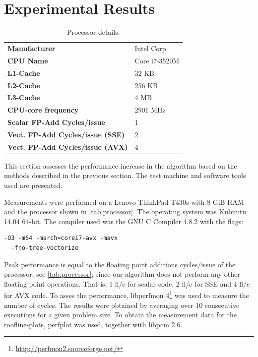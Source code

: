 \section{Experimental Results}

\begin{table}
\begin{center}
\begin{tabular}{>{\bfseries}ll}
Manufacturer         & Intel Corp.\\
CPU Name             & Core i7-3520M\\
L1-Cache             & 32 KB\\
L2-Cache             & 256 KB\\
L3-Cache             & 4 MB\\
CPU-core frequency   & 2901 MHz\\
Scalar FP-Add Cycles/issue  & 1\\
Vect. FP-Add Cycles/issue (SSE) & 2\\
Vect. FP-Add Cycles/issue (AVX) & 4\\
\end{tabular}
\end{center}
\caption{Processor details.}
\label{tab:processor}
\end{table}

This section assesses the performance increase in the algorithm based on
the methods described in the previous section. The test machine and
software tools used are presented.

Measurements were performed on a Lenovo ThinkPad T430s with 8 GiB RAM and
the processor shown in \autoref{tab:processor}. The operating system was
Kubuntu 14.04 64-bit. The compiler used was the GNU C Compiler 4.8.2 with
the flags:
\begin{verbatim}
-O3 -m64 -march=corei7-avx -mavx
  -fno-tree-vectorize
\end{verbatim}

Peak performance is equal to the floating point additions cycles/issue of
the processor, see \autoref{tab:processor}, since our algorithm does not
perform any other floating point operations. That is, 1 fl/c for scalar
code, 2 fl/c for SSE and 4 fl/c for AVX code.
To asses the performance, libperfmon
4\footnote{\url{http://perfmon2.sourceforge.net/}} was used to measure the
number of cycles. The results were obtained by averaging over 10
consecutive executions for a given problem size.
To obtain the measurement data for the roofline-plots, perfplot was used,
together with libpcm 2.6.

